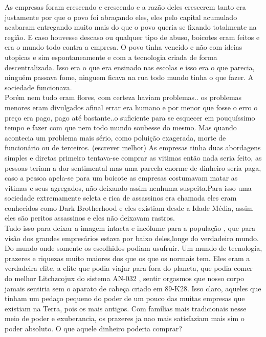\documentclass{book}
\begin{document}
 As empresas foram crescendo e crescendo e a  razão deles crescerem tanto era justamente por que o povo foi abraçando eles, eles pelo capital acumulado acabaram entregando muito mais do que o povo queria se fixando totalmente na região. E caso houvesse descaso ou qualquer tipo de abuso, boicotes eram feitos e era o mundo todo contra a empresa. O povo tinha vencido e não com ideias utopicas e sim espontaneamente e com a tecnologia criada de forma descentralizada. Isso era o que era ensinado nas escolas e isso era o que parecia, ninguém passava fome, ninguem ficava na rua todo mundo tinha o que fazer. A sociedade funcionava. \\
 
 Porém nem tudo eram flores, com certeza haviam problemas.. os problemas menores eram divulgados afinal errar era humano e por menor que fosse o erro o preço era pago, pago até bastante..o suficiente para se esquecer em pouquíssimo tempo e fazer com que nem todo mundo soubesse do mesmo. Mas quando acontecia um problema mais sério, como poluição exagerada, morte de funcionário ou de terceiros. (escrever melhor) As empresas tinha duas abordagens simples e diretas primeiro tentava-se comprar as vitimas então nada seria feito, as pessoas teriam a dor sentimental mas uma parcela enorme de dinheiro seria paga, caso a pessoa apela-se para um boicote as empresas costumavam matar as vitimas e seus agregados, não deixando assim nenhuma suspeita.Para isso uma sociedade extremamente seleta e rica de assassinos era chamada eles eram conhecidos como Dark Brotherhood e eles existiam desde a Idade Média, assim eles são peritos assassinos e eles não deixavam rastros.\\
 Tudo isso para deixar a imagem intacta e incólume para a população , que para visão dos grandes empresários estava por baixo deles,longe do verdadeiro mundo. Do mundo onde somente os escolhidos podiam usufruir. Um mundo de tecnologia, prazeres e riquezas muito maiores dos que os que os normais tem. Eles eram a verdadeira elite, a elite que podia viajar para fora do planeta, que podia comer do melhor Litchzcojux do sistema AN-032 , sentir orgasmos que nosso corpo jamais sentiria sem o aparato de cabeça criado em 89-K28. Isso claro, aqueles que tinham um pedaço pequeno do poder de um pouco das muitas empresas que existiam na Terra, pois os mais antigos. Com famílias mais tradicionais nesse meio de poder e exuberancia, os prazeres ja nao mais satisfaziam mais sim o poder absoluto. O que aquele dinheiro poderia comprar?\\
 
\end{document}

